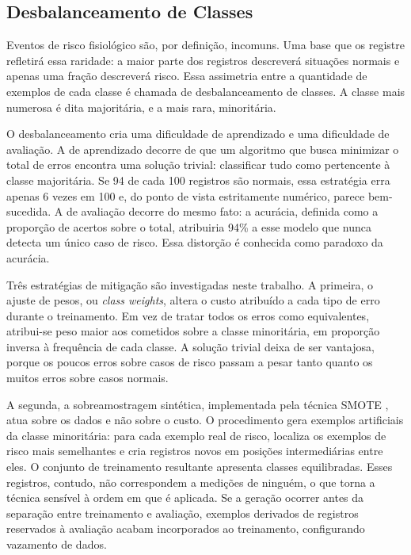 \subsection{Desbalanceamento de Classes}
\label{sec:desbalanceamento}

Eventos de risco fisiológico são, por definição, incomuns. Uma base que os registre refletirá essa raridade: a maior parte dos registros descreverá situações normais e apenas uma fração descreverá risco. Essa assimetria entre a quantidade de exemplos de cada classe é chamada de desbalanceamento de classes. A classe mais numerosa é dita majoritária, e a mais rara, minoritária.

O desbalanceamento cria uma dificuldade de aprendizado e uma dificuldade de avaliação. A de aprendizado decorre de que um algoritmo que busca minimizar o total de erros encontra uma solução trivial: classificar tudo como pertencente à classe majoritária. Se 94 de cada 100 registros são normais, essa estratégia erra apenas 6 vezes em 100 e, do ponto de vista estritamente numérico, parece bem-sucedida. A de avaliação decorre do mesmo fato: a acurácia, definida como a proporção de acertos sobre o total, atribuiria 94\% a esse modelo que nunca detecta um único caso de risco. Essa distorção é conhecida como paradoxo da acurácia.

Três estratégias de mitigação são investigadas neste trabalho. A primeira, o ajuste de pesos, ou \textit{class weights}, altera o custo atribuído a cada tipo de erro durante o treinamento. Em vez de tratar todos os erros como equivalentes, atribui-se peso maior aos cometidos sobre a classe minoritária, em proporção inversa à frequência de cada classe. A solução trivial deixa de ser vantajosa, porque os poucos erros sobre casos de risco passam a pesar tanto quanto os muitos erros sobre casos normais.

A segunda, a sobreamostragem sintética, implementada pela técnica SMOTE \cite{chawla2002}, atua sobre os dados e não sobre o custo. O procedimento gera exemplos artificiais da classe minoritária: para cada exemplo real de risco, localiza os exemplos de risco mais semelhantes e cria registros novos em posições intermediárias entre eles. O conjunto de treinamento resultante apresenta classes equilibradas. Esses registros, contudo, não correspondem a medições de ninguém, o que torna a técnica sensível à ordem em que é aplicada. Se a geração ocorrer antes da separação entre treinamento e avaliação, exemplos derivados de registros reservados à avaliação acabam incorporados ao treinamento, configurando vazamento de dados.

